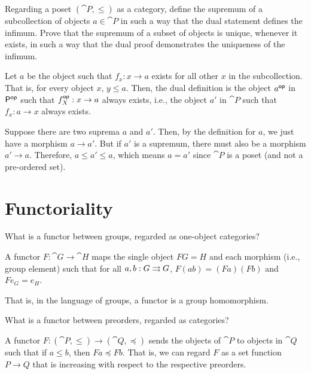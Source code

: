 \documentclass[notes,tikz]{agony}
\begin{document}
\begin{xca}
  Regarding a poset $(\cat P, \leq)$ as a category,
  define the supremum of a subcollection of objects $a \in \cat P$
  in such a way that the dual statement defines the infimum.
  Prove that the supremum of a subset of objects is unique, whenever it exists,
  in such a way that the dual proof demonstrates the uniqueness of the infimum.
\end{xca}
\begin{prf}
  Let $a$ be the object such that $f_x : x \to a$ exists for all other $x$ in the subcollection.
  That is, for every object $x$, $y \leq a$.
  Then, the dual definition is the object $a^{\mathsf{op}}$ in $\mathsf{P}^{\mathsf{op}}$
  such that $f^{\mathsf{op}}_X : x \to a$ always exists, i.e.,
  the object $a'$ in $\cat P$ such that $f_x : a \to x$ always exists.

  Suppose there are two suprema $a$ and $a'$.
  Then, by the definition for $a$, we just have a morphism $a \to a'$.
  But if $a'$ is a supremum, there must also be a morphism $a' \to a$.
  Therefore, $a \leq a' \leq a$, which means $a = a'$ since $\cat P$ is a poset
  (and not a pre-ordered set).
\end{prf}

\section{Functoriality}

\begin{xca}
  What is a functor between groups, regarded as one-object categories?
\end{xca}
\begin{sol}
  A functor $F : \cat G \to \cat H$ maps the single object
  $FG = H$ and each morphism (i.e., group element)
  such that for all $a,b : G \rightrightarrows G$, $F(ab) = (Fa)(Fb)$ and $Fe_G = e_H$.

  That is, in the language of groups, a functor is a group homomorphism.
\end{sol}

\begin{xca}
  What is a functor between preorders, regarded as categories?
\end{xca}
\begin{sol}
  A functor $F : (\cat P, \leq) \to (\cat Q, \preccurlyeq)$
  sends the objects of $\cat P$ to objects in $\cat Q$
  such that if $a \leq b$, then $Fa \preccurlyeq Fb$.
  That is, we can regard $F$ as a set function $P \to Q$
  that is increasing with respect to the respective preorders.
\end{sol}
\end{document}
